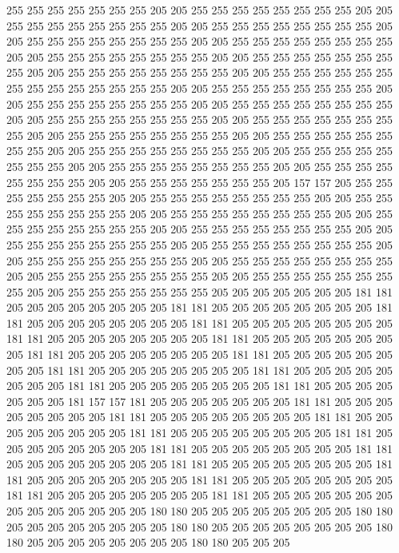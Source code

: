 255 255 255 255 255 255 255 205 205 255 255 255 255 255 255 255 255 205 205 255
255 255 255 255 255 255 255 205 205 255 255 255 255 255 255 255 255 205 205 255
255 255 255 255 255 255 255 205 205 255 255 255 255 255 255 255 255 205 205 255
255 255 255 255 255 255 255 205 205 255 255 255 255 255 255 255 255 205 205 255
255 255 255 255 255 255 255 205 205 255 255 255 255 255 255 255 255 255 255 255
255 255 255 205 205 255 255 255 255 255 255 255 255 205 205 255 255 255 255 255
255 255 255 205 205 255 255 255 255 255 255 255 255 205 205 255 255 255 255 255
255 255 255 205 205 255 255 255 255 255 255 255 255 205 205 255 255 255 255 255
255 255 255 205 205 255 255 255 255 255 255 255 255 205 205 255 255 255 255 255
255 255 255 205 205 255 255 255 255 255 255 255 255 205 205 255 255 255 255 255
255 255 255 205 205 255 255 255 255 255 255 255 255 205 205 255 255 255 255 255
255 255 205 157 157 205 255 255 255 255 255 255 255 205 205 255 255 255 255 255
255 255 255 205 205 255 255 255 255 255 255 255 255 205 205 255 255 255 255 255
255 255 255 205 205 255 255 255 255 255 255 255 255 205 205 255 255 255 255 255
255 255 255 205 205 255 255 255 255 255 255 255 255 205 205 255 255 255 255 255
255 255 255 205 205 255 255 255 255 255 255 255 255 205 205 255 255 255 255 255
255 255 255 205 205 255 255 255 255 255 255 255 255 205 205 255 255 255 255 255
255 255 255 205 205 255 255 255 255 255 255 255 205 205 205 205 205 205 205 181
181 205 205 205 205 205 205 205 205 181 181 205 205 205 205 205 205 205 205 181
181 205 205 205 205 205 205 205 205 181 181 205 205 205 205 205 205 205 205 181
181 205 205 205 205 205 205 205 205 181 181 205 205 205 205 205 205 205 205 181
181 205 205 205 205 205 205 205 205 181 181 205 205 205 205 205 205 205 205 181
181 205 205 205 205 205 205 205 205 181 181 205 205 205 205 205 205 205 205 181
181 205 205 205 205 205 205 205 205 181 181 205 205 205 205 205 205 205 181 157
157 181 205 205 205 205 205 205 205 181 181 205 205 205 205 205 205 205 205 181
181 205 205 205 205 205 205 205 205 181 181 205 205 205 205 205 205 205 205 181
181 205 205 205 205 205 205 205 205 181 181 205 205 205 205 205 205 205 205 181
181 205 205 205 205 205 205 205 205 181 181 205 205 205 205 205 205 205 205 181
181 205 205 205 205 205 205 205 205 181 181 205 205 205 205 205 205 205 205 181
181 205 205 205 205 205 205 205 205 181 181 205 205 205 205 205 205 205 205 181
181 205 205 205 205 205 205 205 205 205 205 205 205 205 205 180 180 205 205 205
205 205 205 205 205 180 180 205 205 205 205 205 205 205 205 180 180 205 205 205
205 205 205 205 205 180 180 205 205 205 205 205 205 205 205 180 180 205 205 205

